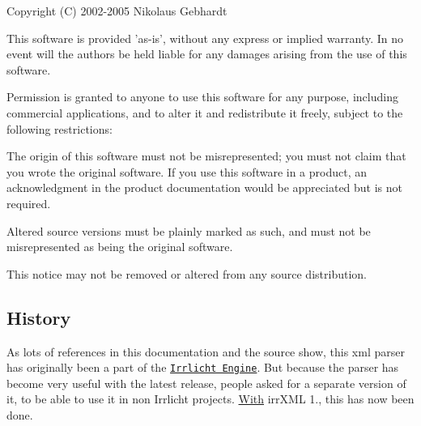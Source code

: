 Copyright (C) 2002-\/2005 Nikolaus Gebhardt

This software is provided 'as-\/is', without any express or implied warranty. In no event will the authors be held liable for any damages arising from the use of this software.

Permission is granted to anyone to use this software for any purpose, including commercial applications, and to alter it and redistribute it freely, subject to the following restrictions\+:


\begin{DoxyEnumerate}
\item The origin of this software must not be misrepresented; you must not claim that you wrote the original software. If you use this software in a product, an acknowledgment in the product documentation would be appreciated but is not required.
\item Altered source versions must be plainly marked as such, and must not be misrepresented as being the original software.
\item This notice may not be removed or altered from any source distribution.
\end{DoxyEnumerate}\hypertarget{irrXML.h_history}{}\subsection{History}\label{irrXML.h_history}
As lots of references in this documentation and the source show, this xml parser has originally been a part of the \href{http://irrlicht.sourceforge.net}{\tt Irrlicht Engine}. But because the parser has become very useful with the latest release, people asked for a separate version of it, to be able to use it in non Irrlicht projects. \hyperlink{struct_with}{With} irr\+X\+M\+L 1., this has now been done.


\begin{DoxyCodeInclude}
\end{DoxyCodeInclude}
 
